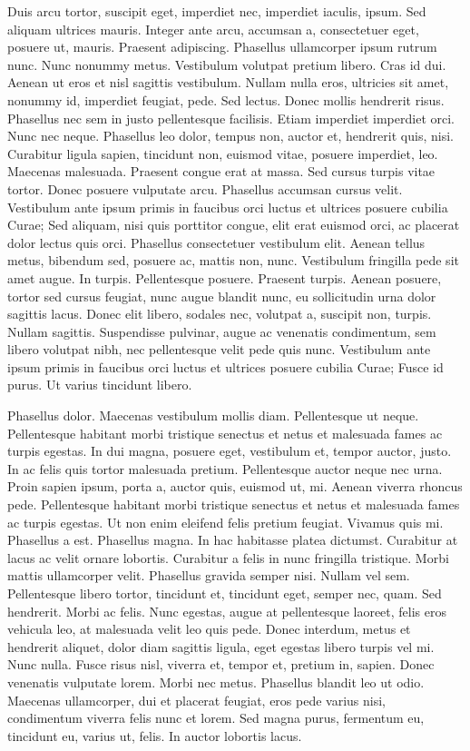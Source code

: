 Duis arcu tortor, suscipit eget, imperdiet nec, imperdiet iaculis, ipsum. Sed aliquam ultrices mauris. Integer ante arcu, accumsan a, consectetuer eget, posuere ut, mauris. Praesent adipiscing. Phasellus ullamcorper ipsum rutrum nunc. Nunc nonummy metus. Vestibulum volutpat pretium libero. Cras id dui. Aenean ut eros et nisl sagittis vestibulum. Nullam nulla eros, ultricies sit amet, nonummy id, imperdiet feugiat, pede. Sed lectus. Donec mollis hendrerit risus. Phasellus nec sem in justo pellentesque facilisis. Etiam imperdiet imperdiet orci. Nunc nec neque. Phasellus leo dolor, tempus non, auctor et, hendrerit quis, nisi. Curabitur ligula sapien, tincidunt non, euismod vitae, posuere imperdiet, leo. Maecenas malesuada. Praesent congue erat at massa. Sed cursus turpis vitae tortor. Donec posuere vulputate arcu. Phasellus accumsan cursus velit. Vestibulum ante ipsum primis in faucibus orci luctus et ultrices posuere cubilia Curae; Sed aliquam, nisi quis porttitor congue, elit erat euismod orci, ac placerat dolor lectus quis orci. Phasellus consectetuer vestibulum elit. Aenean tellus metus, bibendum sed, posuere ac, mattis non, nunc. Vestibulum fringilla pede sit amet augue. In turpis. Pellentesque posuere. Praesent turpis. Aenean posuere, tortor sed cursus feugiat, nunc augue blandit nunc, eu sollicitudin urna dolor sagittis lacus. Donec elit libero, sodales nec, volutpat a, suscipit non, turpis. Nullam sagittis. Suspendisse pulvinar, augue ac venenatis condimentum, sem libero volutpat nibh, nec pellentesque velit pede quis nunc. Vestibulum ante ipsum primis in faucibus orci luctus et ultrices posuere cubilia Curae; Fusce id purus. Ut varius tincidunt libero. 

Phasellus dolor. Maecenas vestibulum mollis diam. Pellentesque ut neque. Pellentesque habitant morbi tristique senectus et netus et malesuada fames ac turpis egestas. In dui magna, posuere eget, vestibulum et, tempor auctor, justo. In ac felis quis tortor malesuada pretium. Pellentesque auctor neque nec urna. Proin sapien ipsum, porta a, auctor quis, euismod ut, mi. Aenean viverra rhoncus pede. Pellentesque habitant morbi tristique senectus et netus et malesuada fames ac turpis egestas. Ut non enim eleifend felis pretium feugiat. Vivamus quis mi. Phasellus a est. Phasellus magna. In hac habitasse platea dictumst. Curabitur at lacus ac velit ornare lobortis. Curabitur a felis in nunc fringilla tristique. Morbi mattis ullamcorper velit. Phasellus gravida semper nisi. Nullam vel sem. Pellentesque libero tortor, tincidunt et, tincidunt eget, semper nec, quam. Sed hendrerit. Morbi ac felis. Nunc egestas, augue at pellentesque laoreet, felis eros vehicula leo, at malesuada velit leo quis pede. Donec interdum, metus et hendrerit aliquet, dolor diam sagittis ligula, eget egestas libero turpis vel mi. Nunc nulla. Fusce risus nisl, viverra et, tempor et, pretium in, sapien. Donec venenatis vulputate lorem. Morbi nec metus. Phasellus blandit leo ut odio. Maecenas ullamcorper, dui et placerat feugiat, eros pede varius nisi, condimentum viverra felis nunc et lorem. Sed magna purus, fermentum eu, tincidunt eu, varius ut, felis. In auctor lobortis lacus. 



